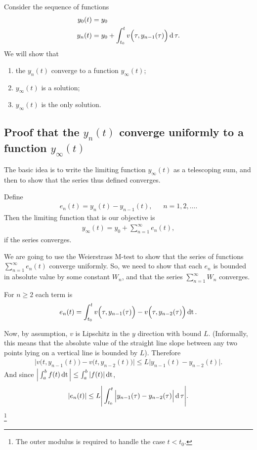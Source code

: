 Consider the sequence of functions
\begin{align*}
  y_0(t) &= y_0\\
  y_n(t) &= y_0 + \int_{t_0}^t v\Big(\tau, y_{n-1}(\tau)\Big) \operatorname{\text{d}}\tau.\\
\end{align*}
We will show that
\begin{enumerate}
\item the $y_n(t)$ converge to a function $y_\infty(t)$;
\item $y_\infty(t)$ is a solution;
\item $y_\infty(t)$ is the only solution.
\end{enumerate}

\subsection{Proof that the $y_n(t)$ converge uniformly to a function $y_\infty(t)$}
The basic idea is to write the limiting function $y_\infty(t)$ as a telescoping
sum, and then to show that the series thus defined converges.

Define
\begin{align*}
  e_n(t) = y_n(t) - y_{n-1}(t), ~~~~~~~ n = 1, 2, \ldots.
\end{align*}
Then the limiting function that is our objective is
\begin{align*}
  y_\infty(t) = y_0 + \sum_{n=1}^\infty e_n(t),
\end{align*}
if the series converges.

We are going to use the Weierstrass M-test to show that the series of functions
$\sum_{n=1}^\infty e_n(t)$ converge uniformly. So, we need to show that each
$e_n$ is bounded in absolute value by some constant $W_n$, and that the series
$\sum_{n=1}^\infty W_n$ converges.

For $n \geq 2$ each term is
\begin{align*}
  e_{n}(t) = \int_{t_0}^t v\Big(\tau, y_{n-1}(\tau)\Big) -
                         v\Big(\tau, y_{n-2}(\tau)\Big) \operatorname{\text{dt}}.
\end{align*}

Now, by assumption, $v$ is Lipschitz in the $y$ direction with bound
$L$. (Informally, this means that the absolute value of the straight line slope
between any two points lying on a vertical line is bounded by $L$). Therefore
\begin{align*}
  \Big|v\Big(t, y_{n-1}(t)\Big) -
       v\Big(t, y_{n-2}(t)\Big)\Big| \leq L\Big|y_{n-1}(t) - y_{n-2}(t)\Big|.
\end{align*}
And since $\Big|\int_a^b f(t) \operatorname{\text{dt}}\Big| \leq \int_a^b |f(t)| \operatorname{\text{dt}}$,
\begin{align*}
  |e_n(t)| \leq L\Bigg|\int_{t_0}^t \Big|y_{n-1}(\tau) - y_{n-2}(\tau)\Big| \operatorname{\text{d}}\tau \Bigg|.
\end{align*}
\footnote{The outer modulus is required to handle the case $t < t_0$.}

